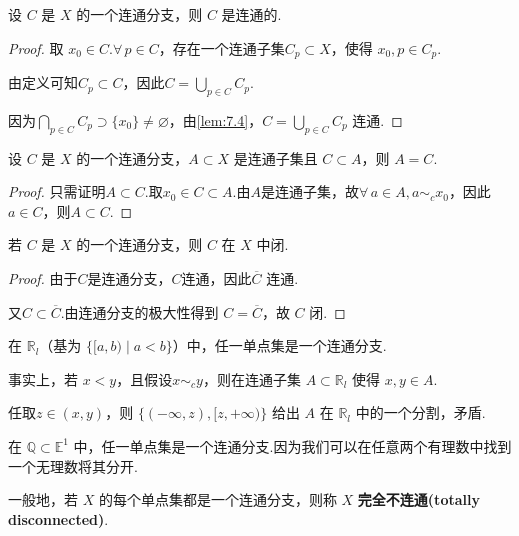 \begin{lemma}[连通分支是连通的][lem:7.5]
    设 $C$ 是 $X$ 的一个连通分支，则 $C$ 是连通的.
\end{lemma}
\begin{proof}
    取 $x_0\in C$.$\forall\,p\in C$，存在一个连通子集$C_p\subset X$，使得 $x_0,p\in C_p$.\par
    由定义可知$C_p\subset C$，因此$C=\bigcup_{p\in C}{C_p}$.\par    
    因为$\bigcap_{p\in C} C_p\supset\{x_0\}\neq\varnothing$，由\cref{lem:7.4}，$C=\bigcup_{p\in C} C_p$ 连通.
\end{proof}

\begin{lemma}[连通分支的极大性][lem:7.6]
    设 $C$ 是 $X$ 的一个连通分支，$A\subset X$ 是连通子集且 $C\subset A$，则 $A=C$.
\end{lemma}
\begin{proof}
    只需证明$A\subset C$.取$x_0\in C\subset A$.由$A$是连通子集，故$\forall\, a\in A,a\sim_c x_0$，因此$a\in C$，则$A\subset C$.
\end{proof}

\begin{lemma}[连通分支是闭集][lem:7.7]
    若 $C$ 是 $X$ 的一个连通分支，则 $C$ 在 $X$ 中闭.
\end{lemma}
\begin{proof}
   由于$C$是连通分支，$C$连通，因此$\overline{C}$ 连通.\par
   又$C\subset \overline{C}$.由连通分支的极大性得到 $C=\overline{C}$，故 $C$ 闭.
\end{proof}

\begin{instance}
    在 $\mathbb{R}_l$（基为 $\{[a,b)\mid a<b\}$）中，任一单点集是一个连通分支.\par
    事实上，若 $x<y$，且假设$x\sim_c y$，则在连通子集 $A\subset \mathbb{R}_l$ 使得 $x,y\in A$.\par
    任取$z\in(x,y)$，则 $\{(-\infty,z),[z,+\infty)\}$ 给出 $A$ 在 $\mathbb{R}_l$ 中的一个分割，矛盾.
\end{instance}

\begin{instance}
    在 $\mathbb{Q}\subset \mathbb{E}^1$ 中，任一单点集是一个连通分支.因为我们可以在任意两个有理数中找到一个无理数将其分开.\par
    一般地，若 $X$ 的每个单点集都是一个连通分支，则称 $X$ \textbf{完全不连通(totally disconnected)}.
\end{instance}



